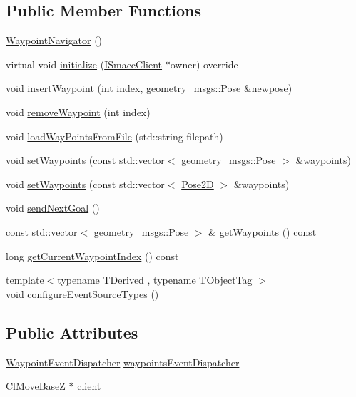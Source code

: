 \subsection*{Public Member Functions}
\begin{DoxyCompactItemize}
\item 
\hyperlink{classsmacc_1_1WaypointNavigator_a8924fe11db589727a91048ffdba2a85f}{Waypoint\+Navigator} ()
\item 
virtual void \hyperlink{classsmacc_1_1WaypointNavigator_a3b6358de6088ba60937e0748bb9af0cb}{initialize} (\hyperlink{classsmacc_1_1ISmaccClient}{I\+Smacc\+Client} $\ast$owner) override
\item 
void \hyperlink{classsmacc_1_1WaypointNavigator_abdcd86738247eccaf849903881247b0d}{insert\+Waypoint} (int index, geometry\+\_\+msgs\+::\+Pose \&newpose)
\item 
void \hyperlink{classsmacc_1_1WaypointNavigator_a4c290be90b5bfa44687f8beaa867f9b8}{remove\+Waypoint} (int index)
\item 
void \hyperlink{classsmacc_1_1WaypointNavigator_a3324ee12d697827e242b48ab3fd23edb}{load\+Way\+Points\+From\+File} (std\+::string filepath)
\item 
void \hyperlink{classsmacc_1_1WaypointNavigator_a2cb7fb208ade09ed7af4585837d051ee}{set\+Waypoints} (const std\+::vector$<$ geometry\+\_\+msgs\+::\+Pose $>$ \&waypoints)
\item 
void \hyperlink{classsmacc_1_1WaypointNavigator_a035fd5f71532fa87981a477fde5d363c}{set\+Waypoints} (const std\+::vector$<$ \hyperlink{structsmacc_1_1Pose2D}{Pose2D} $>$ \&waypoints)
\item 
void \hyperlink{classsmacc_1_1WaypointNavigator_a127438f90a00e98628ebd64b4c84b0b7}{send\+Next\+Goal} ()
\item 
const std\+::vector$<$ geometry\+\_\+msgs\+::\+Pose $>$ \& \hyperlink{classsmacc_1_1WaypointNavigator_afe1e18903d81f1d3eb20e2689f25b2ca}{get\+Waypoints} () const 
\item 
long \hyperlink{classsmacc_1_1WaypointNavigator_a6da63a864cb26b56922ca8c685e1a49c}{get\+Current\+Waypoint\+Index} () const 
\item 
{\footnotesize template$<$typename T\+Derived , typename T\+Object\+Tag $>$ }\\void \hyperlink{classsmacc_1_1WaypointNavigator_a7fc69e48021d638d86bcc8dff18f723a}{configure\+Event\+Source\+Types} ()
\end{DoxyCompactItemize}
\subsection*{Public Attributes}
\begin{DoxyCompactItemize}
\item 
\hyperlink{classsmacc_1_1WaypointEventDispatcher}{Waypoint\+Event\+Dispatcher} \hyperlink{classsmacc_1_1WaypointNavigator_aab7ff616b0eba7a5ad5f03113f2de8fd}{waypoints\+Event\+Dispatcher}
\item 
\hyperlink{classsmacc_1_1ClMoveBaseZ}{Cl\+Move\+BaseZ} $\ast$ \hyperlink{classsmacc_1_1WaypointNavigator_a2bdb0d4aea851d877fcb20e6d0897bb8}{client\+\_\+}
\end{DoxyCompactItemize}
